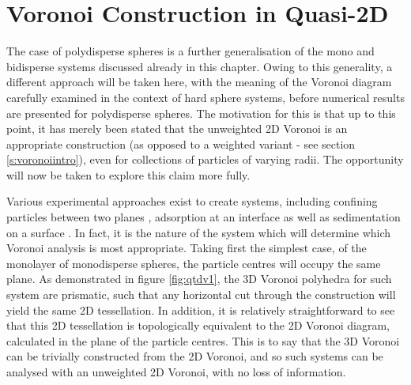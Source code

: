 \section{Voronoi Construction in Quasi\--2D}

The case of \qtd{} polydisperse spheres is a further generalisation of the mono and bidisperse systems discussed already in this chapter.
Owing to this generality, a different approach will be taken here, with the meaning of the Voronoi diagram carefully examined in the context of \qtd{} hard sphere systems, before numerical results are presented for polydisperse spheres.
The motivation for this is that up to this point, it has merely been stated that the unweighted 2D Voronoi is an appropriate construction (as opposed to a weighted variant - see section \ref{s:voronoiintro}), even for collections of particles of varying radii.
The opportunity will now be taken to explore this claim more fully.

Various experimental approaches exist to create \qtd{} systems, including confining particles between two planes \cite{Marcus1997,Weikai2014}, adsorption at an interface \cite{Peng2009,Vogel2014} as well as sedimentation on a surface \cite{Tamborini2015,Thorneywork2018}.
In fact, it is the nature of the system which will determine which Voronoi analysis is most appropriate.
Taking first the simplest \qtd{} case, of the monolayer of monodisperse spheres, the particle centres will occupy the same plane.
As demonstrated in figure \ref{fig:qtdv1}, the 3D Voronoi polyhedra for such system are prismatic, such that any horizontal cut through the construction will yield the same 2D tessellation. 
In addition, it is relatively straightforward to see that this 2D tessellation is topologically equivalent to the 2D Voronoi diagram, calculated in the plane of the particle centres.
This is to say that the 3D Voronoi can be trivially constructed from the 2D Voronoi, and so such systems can be analysed with an unweighted 2D Voronoi, with no loss of information.

